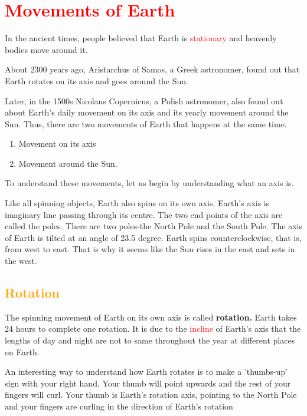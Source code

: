 \section{\textcolor{red}{Movements of Earth}}
In the ancient times, people believed that Earth is \textcolor{red}{stationary} and heavenly bodies move around it.
\par
\vspace{0.1in}
About 2300 years ago, Aristarchus of Samos, a Greek astronomer, found out that Earth rotates on its axis and goes around the Sun.
\par
\vspace{0.1in}
Later, in the 1500s Nicolaus Copernicus, a Polish astronomer, also found out about Earth's daily movement on its axis and its yearly movement around the Sun. Thus, there are two movements of Earth that happens at the same time.
\begin{enumerate}
    \item Movement on its axis
    \vspace{0.1in}
    \item Movement around the Sun.
\end{enumerate}
\par
\vspace{0.1in}
To understand these movements, let us begin by understanding what an axis is.
\par
\vspace{0.1in}
Like all spinning objects, Earth also spins on its own axis. Earth's axis is imaginary line passing through its centre. The two end points of the axis are called the poles. There are two poles-the North Pole and the South Pole. The axis of Earth is tilted at an angle of 23.5 degree. Earth spins counterclockwise, that is, from west to east. That is why it seems like the Sun rises in the east and sets in the west.
\subsection{\textcolor{orange}{Rotation}}
The spinning movement of Earth on its own axis is called \textbf{rotation.} Earth takes 24 hours to complete one rotation. It is due to the \textcolor{red}{incline} of Earth's axis that the lengths of day and night are not to same throughout the year at different places on Earth.
\par
\vspace{0.1in}
An interesting way to understand how Earth rotates is to make a 'thumbs-up' sign with your right hand. Your thumb will point upwards and the rest of your fingers will curl. Your thumb is Earth's rotation axis, pointing to the North Pole and your fingers are curling in the direction of Earth's rotation
